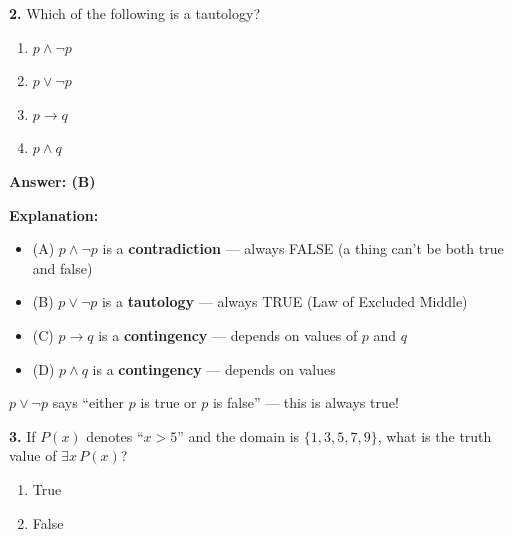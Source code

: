 \documentclass[11pt,a4paper]{article}
\begin{document}
\vspace{10pt}

\textbf{2.} Which of the following is a tautology?

\begin{enumerate}[label=(\Alph*),noitemsep]
    \item $p \land \neg p$
    \item $p \lor \neg p$
    \item $p \to q$
    \item $p \land q$
\end{enumerate}

\begin{solnbox}
\textbf{Answer: (B)}

\textbf{Explanation:}
\begin{itemize}[noitemsep]
    \item (A) $p \land \neg p$ is a \textbf{contradiction} --- always FALSE (a thing can't be both true and false)
    \item (B) $p \lor \neg p$ is a \textbf{tautology} --- always TRUE (Law of Excluded Middle)
    \item (C) $p \to q$ is a \textbf{contingency} --- depends on values of $p$ and $q$
    \item (D) $p \land q$ is a \textbf{contingency} --- depends on values
\end{itemize}

$p \lor \neg p$ says ``either $p$ is true or $p$ is false'' --- this is always true!
\end{solnbox}

\vspace{10pt}

\textbf{3.} If $P(x)$ denotes ``$x > 5$'' and the domain is $\{1, 3, 5, 7, 9\}$, what is the truth value of $\exists x\, P(x)$?

\begin{enumerate}[label=(\Alph*),noitemsep]
    \item True
    \item False
\end{enumerate}
\end{document}
